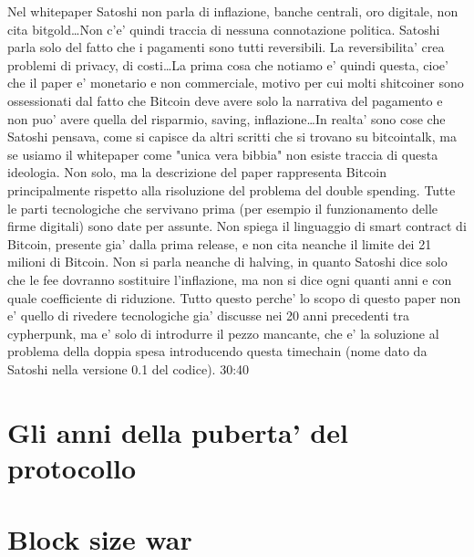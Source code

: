 \documentclass{article}
\begin{document}
Nel whitepaper Satoshi non parla di inflazione, banche centrali, oro digitale, non cita bitgold\dots Non c'e' quindi traccia di nessuna connotazione politica. Satoshi parla solo del fatto che i pagamenti sono tutti reversibili. La reversibilita' crea problemi di privacy, di costi\dots La prima cosa che notiamo e' quindi questa, cioe' che il paper e' monetario e non commerciale, motivo per cui molti shitcoiner sono ossessionati dal fatto che Bitcoin deve avere solo la narrativa del pagamento e non puo' avere quella del risparmio, saving, inflazione\dots In realta' sono cose che Satoshi pensava, come si capisce da altri scritti che si trovano su bitcointalk, ma se usiamo il whitepaper come "unica vera bibbia" non esiste traccia di questa ideologia. Non solo, ma la descrizione del paper rappresenta Bitcoin principalmente rispetto alla risoluzione del problema del double spending. Tutte le parti tecnologiche che servivano prima (per esempio il funzionamento delle firme digitali) sono date per assunte. Non spiega il linguaggio di smart contract di Bitcoin, presente gia' dalla prima release, e non cita neanche il limite dei 21 milioni di Bitcoin. Non si parla neanche di halving, in quanto Satoshi dice solo che le fee dovranno sostituire l'inflazione, ma non si dice ogni quanti anni e con quale coefficiente di riduzione. Tutto questo perche' lo scopo di questo paper non e' quello di rivedere tecnologiche gia' discusse nei 20 anni precedenti tra cypherpunk, ma e' solo di introdurre il pezzo mancante, che e' la soluzione al problema della doppia spesa introducendo questa timechain (nome dato da Satoshi nella versione 0.1 del codice).
30:40
\section{Gli anni della puberta' del protocollo}

\section{Block size war}
\end{document}
